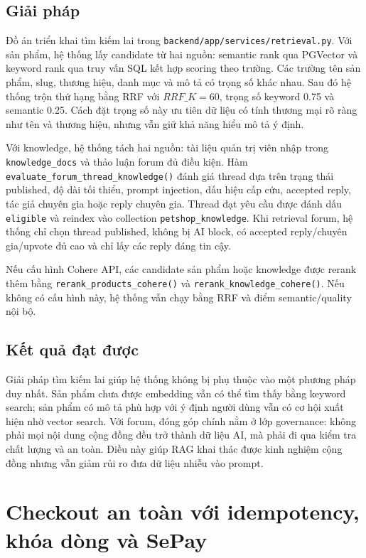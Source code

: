 \documentclass[../DoAn.tex]{subfiles}
\begin{document}
\subsection{Giải pháp}
\label{subsection:5.2.2}

Đồ án triển khai tìm kiếm lai trong \texttt{backend/app/services/retrieval.py}. Với sản phẩm, hệ thống lấy candidate từ hai nguồn: semantic rank qua PGVector và keyword rank qua truy vấn SQL kết hợp scoring theo trường. Các trường tên sản phẩm, slug, thương hiệu, danh mục và mô tả có trọng số khác nhau. Sau đó hệ thống trộn thứ hạng bằng RRF với \(RRF\_K=60\), trọng số keyword 0.75 và semantic 0.25. Cách đặt trọng số này ưu tiên dữ liệu có tính thương mại rõ ràng như tên và thương hiệu, nhưng vẫn giữ khả năng hiểu mô tả ý định.

Với knowledge, hệ thống tách hai nguồn: tài liệu quản trị viên nhập trong \texttt{knowledge\_docs} và thảo luận forum đủ điều kiện. Hàm \texttt{evaluate\_forum\_thread\_knowledge()} đánh giá thread dựa trên trạng thái published, độ dài tối thiểu, prompt injection, dấu hiệu cấp cứu, accepted reply, tác giả chuyên gia hoặc reply chuyên gia. Thread đạt yêu cầu được đánh dấu \texttt{eligible} và reindex vào collection \texttt{petshop\_knowledge}. Khi retrieval forum, hệ thống chỉ chọn thread published, không bị AI block, có accepted reply/chuyên gia/upvote đủ cao và chỉ lấy các reply đáng tin cậy.

Nếu cấu hình Cohere API, các candidate sản phẩm hoặc knowledge được rerank thêm bằng \texttt{rerank\_products\_cohere()} và \texttt{rerank\_knowledge\_cohere()}. Nếu không có cấu hình này, hệ thống vẫn chạy bằng RRF và điểm semantic/quality nội bộ.

\subsection{Kết quả đạt được}
\label{subsection:5.2.3}

Giải pháp tìm kiếm lai giúp hệ thống không bị phụ thuộc vào một phương pháp duy nhất. Sản phẩm chưa được embedding vẫn có thể tìm thấy bằng keyword search; sản phẩm có mô tả phù hợp với ý định người dùng vẫn có cơ hội xuất hiện nhờ vector search. Với forum, đóng góp chính nằm ở lớp governance: không phải mọi nội dung cộng đồng đều trở thành dữ liệu AI, mà phải đi qua kiểm tra chất lượng và an toàn. Điều này giúp RAG khai thác được kinh nghiệm cộng đồng nhưng vẫn giảm rủi ro đưa dữ liệu nhiễu vào prompt.

\section{Checkout an toàn với idempotency, khóa dòng và SePay}
\label{section:5.3}
\end{document}
